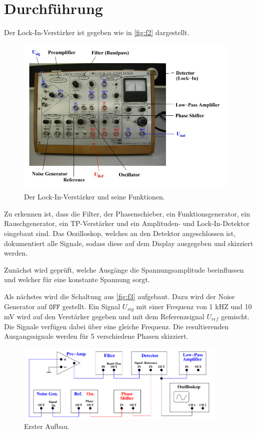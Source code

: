 \section{Durchführung}
\label{sec:Durchführung}

Der Lock-In-Verstärker ist gegeben wie in \autoref{fig:f2} dargestellt.
\begin{figure}[H]
    \centering
        \centering
        \includegraphics[width=0.95\textwidth]{Bilder/LIV.jpg}
        \caption{Der Lock-In-Verstärker und seine Funktionen. \cite{anleitung2}}
    \hfill
    \label{fig:f2}
\end{figure}
\noindent Zu erkennen ist, dass die Filter, der Phasenschieber, ein
Funktionsgenerator, ein Rauschgenerator, ein TP-Verstärker und ein Amplituden-
und Lock-In-Detektor eingebaut sind. Das Oszilloskop, welches an den Detektor
angeschlossen ist, dokumentiert alle Signale, sodass diese auf dem Display
ausgegeben und skizziert werden.
\par\vspace{0.5em}
\noindent Zunächst wird geprüft, welche Ausgänge die Spannungsamplitude 
beeinflussen und welcher für eine konstante Spannung sorgt.
\par\vspace{0.5em}
\noindent Als nächstes wird die Schaltung aus \autoref{fig:f3} aufgebaut. Dazu
wird der Noise Generator auf $\texttt{OFF}$ gestellt. Ein Signal $U_{sig}$ mit einer
Frequenz von 1 kHZ und 10 mV wird auf den Verstärker gegeben und mit dem 
Referenzsignal $U_{ref}$ gemischt. Die Signale verfügen dabei über eine 
gleiche Frequenz. Die resultierenden Ausgangssignale werden für 5 verschiedene 
Phasen skizziert.
\begin{figure}[H]
    \centering
        \centering
        \includegraphics[width=0.9\textwidth]{Bilder/baute1.png}
        \caption{Erster Aufbau. \cite{anleitung2}}
    \hfill
    \label{fig:f3}
\end{figure}
